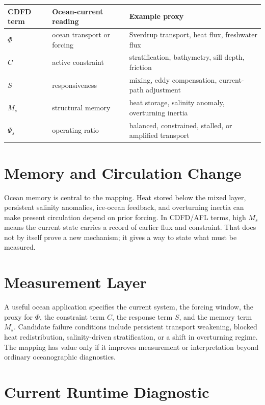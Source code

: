 \documentclass[12pt,a4paper]{article}
\begin{document}
\begin{table}[h]
\centering
\begin{tabularx}{\textwidth}{@{}lXX@{}}
\toprule
CDFD term & Ocean-current reading & Example proxy \\
\midrule
$\Phi$ & ocean transport or forcing & Sverdrup transport, heat flux, freshwater flux \\
$C$ & active constraint & stratification, bathymetry, sill depth, friction \\
$S$ & responsiveness & mixing, eddy compensation, current-path adjustment \\
$M_s$ & structural memory & heat storage, salinity anomaly, overturning inertia \\
$\Psi_s$ & operating ratio & balanced, constrained, stalled, or amplified transport \\
\bottomrule
\end{tabularx}
\end{table}

\section{Memory and Circulation Change}

Ocean memory is central to the mapping. Heat stored below the mixed layer,
persistent salinity anomalies, ice-ocean feedback, and overturning inertia can
make present circulation depend on prior forcing. In CDFD/AFL terms, high
$M_s$ means the current state carries a record of earlier flux and constraint.
That does not by itself prove a new mechanism; it gives a way to state what
must be measured.

\section{Measurement Layer}

A useful ocean application specifies the current system, the forcing window,
the proxy for $\Phi$, the constraint term $C$, the response term $S$, and the
memory term $M_s$. Candidate failure conditions include persistent transport
weakening, blocked heat redistribution, salinity-driven stratification, or a
shift in overturning regime. The mapping has value only if it improves
measurement or interpretation beyond ordinary oceanographic diagnostics.

\section{Current Runtime Diagnostic}
\end{document}

